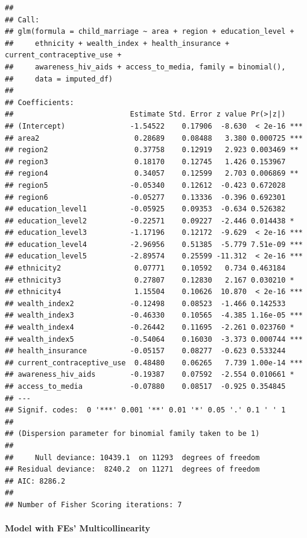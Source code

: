 \documentclass[
]{article}
\begin{document}
\begin{verbatim}
## 
## Call:
## glm(formula = child_marriage ~ area + region + education_level + 
##     ethnicity + wealth_index + health_insurance + current_contraceptive_use + 
##     awareness_hiv_aids + access_to_media, family = binomial(), 
##     data = imputed_df)
## 
## Coefficients:
##                           Estimate Std. Error z value Pr(>|z|)    
## (Intercept)               -1.54522    0.17906  -8.630  < 2e-16 ***
## area2                      0.28689    0.08488   3.380 0.000725 ***
## region2                    0.37758    0.12919   2.923 0.003469 ** 
## region3                    0.18170    0.12745   1.426 0.153967    
## region4                    0.34057    0.12599   2.703 0.006869 ** 
## region5                   -0.05340    0.12612  -0.423 0.672028    
## region6                   -0.05277    0.13336  -0.396 0.692301    
## education_level1          -0.05925    0.09353  -0.634 0.526382    
## education_level2          -0.22571    0.09227  -2.446 0.014438 *  
## education_level3          -1.17196    0.12172  -9.629  < 2e-16 ***
## education_level4          -2.96956    0.51385  -5.779 7.51e-09 ***
## education_level5          -2.89574    0.25599 -11.312  < 2e-16 ***
## ethnicity2                 0.07771    0.10592   0.734 0.463184    
## ethnicity3                 0.27807    0.12830   2.167 0.030210 *  
## ethnicity4                 1.15504    0.10626  10.870  < 2e-16 ***
## wealth_index2             -0.12498    0.08523  -1.466 0.142533    
## wealth_index3             -0.46330    0.10565  -4.385 1.16e-05 ***
## wealth_index4             -0.26442    0.11695  -2.261 0.023760 *  
## wealth_index5             -0.54064    0.16030  -3.373 0.000744 ***
## health_insurance          -0.05157    0.08277  -0.623 0.533244    
## current_contraceptive_use  0.48480    0.06265   7.739 1.00e-14 ***
## awareness_hiv_aids        -0.19387    0.07592  -2.554 0.010661 *  
## access_to_media           -0.07880    0.08517  -0.925 0.354845    
## ---
## Signif. codes:  0 '***' 0.001 '**' 0.01 '*' 0.05 '.' 0.1 ' ' 1
## 
## (Dispersion parameter for binomial family taken to be 1)
## 
##     Null deviance: 10439.1  on 11293  degrees of freedom
## Residual deviance:  8240.2  on 11271  degrees of freedom
## AIC: 8286.2
## 
## Number of Fisher Scoring iterations: 7
\end{verbatim}

\hypertarget{model-with-fes-multicollinearity}{%
\paragraph{Model with FEs'
Multicollinearity}\label{model-with-fes-multicollinearity}}
\end{document}
